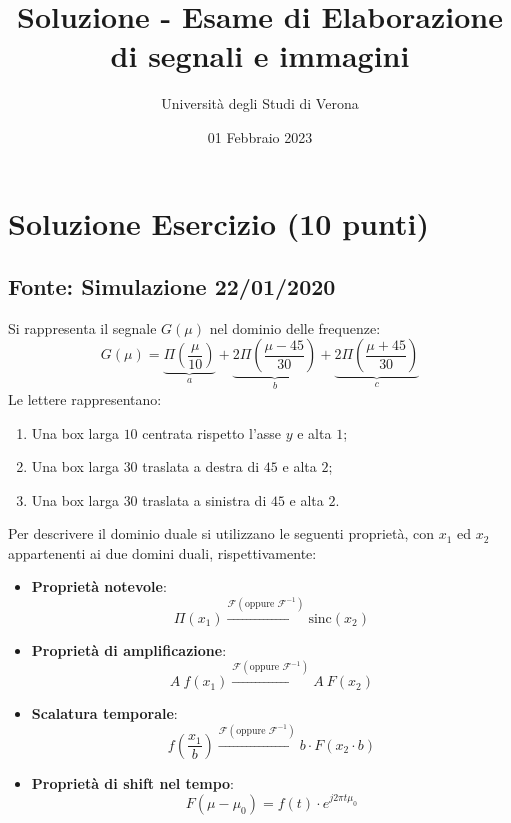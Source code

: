\documentclass[a4paper]{article}
\begin{document}
	\author{Università degli Studi di Verona}
	\title{Soluzione - Esame di Elaborazione di segnali e immagini}
	\date{{\Large 01 Febbraio 2023}}
	\maketitle
	
	\section{Soluzione Esercizio (10 punti)}
	\subsection*{Fonte: Simulazione 22/01/2020}
	
	Si rappresenta il segnale $G\left(\mu\right)$ nel dominio delle frequenze:
	\begin{equation*}
		G\left(\mu\right) = \underbrace{\Pi\left(\dfrac{\mu}{10}\right)}_{a} + \underbrace{2\Pi\left(\dfrac{\mu - 45}{30}\right)}_{b} + \underbrace{2\Pi\left(\dfrac{\mu + 45}{30}\right)}_{c}
	\end{equation*}
	Le lettere rappresentano:
	\begin{enumerate}[label=\alph*)]
		\item Una box larga $10$ centrata rispetto l'asse $y$ e alta $1$;
		\item Una box larga $30$ traslata a destra di $45$ e alta $2$;
		\item Una box larga $30$ traslata a sinistra di $45$ e alta $2$.
	\end{enumerate}
	Per descrivere il dominio duale si utilizzano le seguenti proprietà, con $x_{1}$ ed $x_{2}$ appartenenti ai due domini duali, rispettivamente:
	\begin{itemize}
		\item \textbf{Proprietà notevole}:
		\begin{equation*}
			\Pi\left(x_{1}\right) \xrightarrow{\mathscr{F}\left(\text{oppure } \mathscr{F}^{-1}\right)} \mathrm{sinc}\left(x_{2}\right)
		\end{equation*}
		
		\item \textbf{Proprietà di amplificazione}:
		\begin{equation*}
			A \: f\left(x_{1}\right) \xrightarrow{\mathscr{F}\left(\text{oppure } \mathscr{F}^{-1}\right)} A \: F\left(x_{2}\right)
		\end{equation*}
		
		\item \textbf{Scalatura temporale}:
		\begin{equation*}
			f\left(\dfrac{x_{1}}{b}\right) \xrightarrow{\mathscr{F}\left(\text{oppure } \mathscr{F}^{-1}\right)} b \cdot F\left(x_{2} \cdot b\right)
		\end{equation*}
		
		\item \textbf{Proprietà di shift nel tempo}:
		\begin{equation*}
			F\left(\mu - \mu_{0}\right) = f\left(t\right) \cdot e^{j2\pi t \mu_{0}}
		\end{equation*}
	\end{itemize}\newpage
\end{document}
